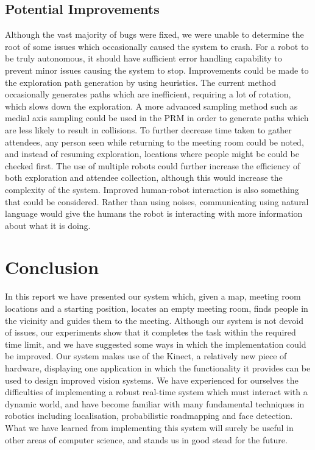 \documentclass[conference]{IEEEtran}
\begin{document}
\subsection{Potential Improvements}
Although the vast majority of bugs were fixed, we were unable to determine the root of some issues which occasionally caused the system to crash. For a robot to be truly autonomous, it should have sufficient error handling capability to prevent minor issues causing the system to stop. Improvements could be made to the exploration path generation by using heuristics. The current method occasionally generates paths which are inefficient, requiring a lot of rotation, which slows down the exploration. A more advanced sampling method such as medial axis sampling could be used in the PRM in order to generate paths which are less likely to result in collisions. To further decrease time taken to gather attendees, any person seen while returning to the meeting room could be noted, and instead of resuming exploration, locations where people might be could be checked first. The use of multiple robots could further increase the efficiency of both exploration and attendee collection, although this would increase the complexity of the system. Improved human-robot interaction is also something that could be considered. Rather than using noises, communicating using natural language would give the humans the robot is interacting with more information about what it is doing.
\section{Conclusion}
In this report we have presented our system which, given a map, meeting room locations and a starting position, locates an empty meeting room, finds people in the vicinity and guides them to the meeting. Although our system is not devoid of issues, our experiments show that it completes the task within the required time limit, and we have suggested some ways in which the implementation could be improved. Our system makes use of the Kinect, a relatively new piece of hardware, displaying one application in which the functionality it provides can be used to design improved vision systems. We have experienced for ourselves the difficulties of implementing a robust real-time system which must interact with a dynamic world, and have become familiar with many fundamental techniques in robotics including localisation, probabilistic roadmapping and face detection. What we have learned from implementing this system will surely be useful in other areas of computer science, and stands us in good stead for the future.


\end{document}
